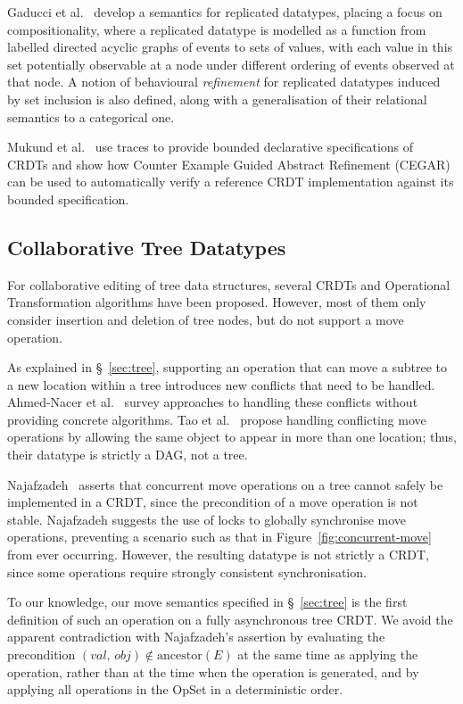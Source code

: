 Gaducci et al.~\cite{DBLP:conf/coordination/GadducciMR17} develop a semantics for replicated datatypes, placing a focus on compositionality, where a replicated datatype is modelled as a function from labelled directed acyclic graphs of events to sets of values, with each value in this set potentially observable at a node under different ordering of events observed at that node.
A notion of behavioural \emph{refinement} for replicated datatypes induced by set inclusion is also defined, along with a generalisation of their relational semantics to a categorical one.

Mukund et al.~\cite{DBLP:conf/atva/MukundRS15} use traces to provide bounded declarative specifications of CRDTs and show how Counter Example Guided Abstract Refinement (CEGAR) can be used to automatically verify a reference CRDT implementation against its bounded specification.

\subsection{Collaborative Tree Datatypes}

For collaborative editing of tree data structures, several CRDTs \cite{Martin:2010ih,Kleppmann:2016ve} and Operational Transformation algorithms \cite{Jungnickel:2016cb,Ignat:2003jy,Davis:2002iv} have been proposed.
However, most of them only consider insertion and deletion of tree nodes, but do not support a move operation.

As explained in \S~\ref{sec:tree}, supporting an operation that can move a subtree to a new location within a tree introduces new conflicts that need to be handled.
Ahmed-Nacer et al.~\cite{AhmedNacer:2012us} survey approaches to handling these conflicts without providing concrete algorithms.
Tao et al.~\cite{Tao:2015gd} propose handling conflicting move operations by allowing the same object to appear in more than one location; thus, their datatype is strictly a DAG, not a tree.

Najafzadeh~\cite{Najafzadeh:2017vk} asserts that concurrent move operations on a tree cannot safely be implemented in a CRDT, since the precondition of a move operation is not stable.
Najafzadeh suggests the use of locks to globally synchronise move operations, preventing a scenario such as that in Figure~\ref{fig:concurrent-move} from ever occurring.
However, the resulting datatype is not strictly a CRDT, since some operations require strongly consistent synchronisation.

To our knowledge, our move semantics specified in \S~\ref{sec:tree} is the first definition of such an operation on a fully asynchronous tree CRDT.
We avoid the apparent contradiction with Najafzadeh's assertion by evaluating the precondition $(\mathit{val},\, \mathit{obj}) \notin \mathrm{ancestor}(E)$ at the same time as applying the operation, rather than at the time when the operation is generated, and by applying all operations in the OpSet in a deterministic order.
